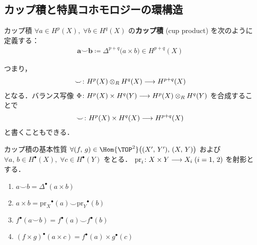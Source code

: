 \documentclass[algtopo_main]{subfiles}
\begin{document}
\subsection{カップ積と特異コホモロジーの環構造}

\begin{mydef}[label=def:cup]{カップ積}
    $\forall a \in H^p (X),\; \forall b \in H^q (X)$ の\textbf{カップ積} (cup product) を次のように定義する：
    \begin{align}
        \bm{a \smile b} \coloneqq \Delta^{p+q} \bigl( a \times b \bigr) \in H^{p+q} (X)
    \end{align}
\end{mydef}
つまり，
\begin{align}
    \smile \colon H^p(X) \otimes_R H^q(X) \longrightarrow H^{p+q} (X)
\end{align}
となる．バランス写像 $\Phi \colon H^p(X)\times H^q (Y) \longrightarrow H^p  (X)\otimes_R H^q (Y)$ を合成することで
\begin{align}
    \smile \colon H^p (X) \times H^q (X)  \longrightarrow H^{p+q} (X)
\end{align}
と書くこともできる．

\begin{mylem}[label=lem:cup-basic]{カップ積の基本性質}
    $\forall (f,\, g) \in \Hom{\TOP^2} \bigl( (X',\, Y'),\, (X,\, Y) \bigr) $ および $\forall a,\, b \in H^\bullet (X) ,\; \forall c \in H^\bullet  (Y)$ をとる．
    $\mathrm{pr}_i \colon X\times Y \longrightarrow  X_i\; (i=1,\, 2)$ を射影とする．
    \begin{enumerate}
        \item $a \smile b = \Delta^\bullet (a \times b)$
        \item $a \times b = \mathrm{pr}_X {}^\bullet (a) \smile \mathrm{pr}_Y{}^\bullet(b)$
        \item $f^\bullet(a \smile b) = f^\bullet (a) \smile f^\bullet (b)$
        \item $(f \times g)^\bullet (a \times c) = f^\bullet(a) \times g^\bullet(c)$
    \end{enumerate}
    
\end{mylem}
\end{document}
